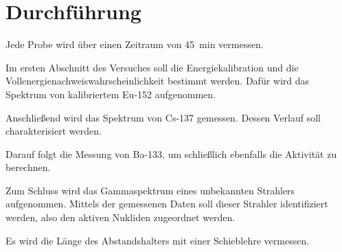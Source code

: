 \section{Durchführung}
\label{sec:durchführung}

Jede Probe wird über einen Zeitraum von \qty{45}{\minute} vermessen.

Im ersten Abschnitt des Versuches soll die Energiekalibration und die Vollenergienachweiswahrscheinlichkeit
bestimmt werden. Dafür wird das Spektrum von kalibriertem Eu-152 aufgenommen.

Anschließend wird das Spektrum von Cs-137 gemessen. Dessen Verlauf soll charakterisiert werden.

Darauf folgt die Messung von Ba-133, um schließlich ebenfalls die Aktivität zu berechnen.

Zum Schluss wird das Gammaspektrum eines unbekannten Strahlers aufgenommen.
Mittels der gemessenen Daten soll dieser Strahler identifiziert werden, also den aktiven 
Nukliden zugeordnet werden.

Es wird die Länge des Abstandshalters mit einer Schieblehre vermessen.
